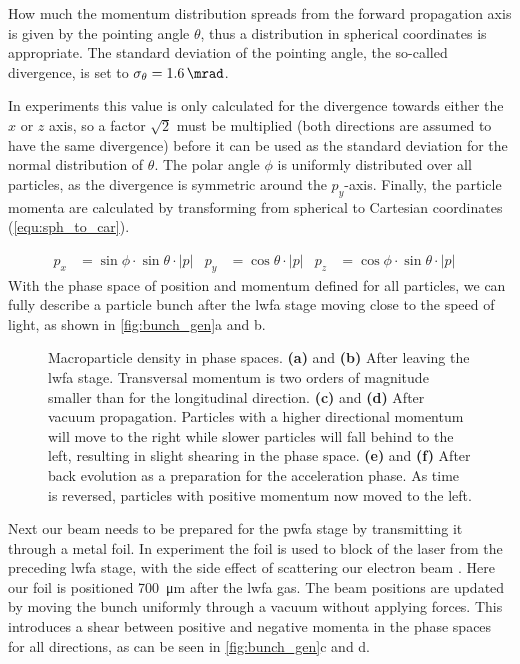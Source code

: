 \documentclass[bachelor_thesis]{subfiles}
\begin{document}
How much the momentum distribution spreads from the forward propagation axis is given by the pointing angle $\theta$, thus a distribution in spherical coordinates is appropriate. The standard deviation of the pointing angle, 
the so-called divergence, is set to $\sigma_{\theta}=\qty{1.6}{\mrad}$.

In experiments this value is only calculated for the divergence towards either the $x$ or $z$ axis, so a factor $\sqrt{2}$ must be multiplied (both directions are assumed to have the same divergence) before 
it can be used as the standard deviation for the normal distribution of $\theta$. The polar angle $\phi$ is uniformly distributed over all particles, as the divergence is symmetric around the $p_y$-axis.
Finally, the particle momenta are calculated by transforming from spherical to Cartesian coordinates (\autoref{equ:sph_to_car}). 

\begin{align}
	p_x&=\sin{\phi} \cdot \sin{\theta} \cdot \left|p\right|	&
	p_y&=\cos{\theta} \cdot \left|p\right|				&
	p_z&=\cos{\phi} \cdot \sin{\theta} \cdot \left|p\right|	&
	\label{equ:sph_to_car}
\end{align}
With the phase space of position and momentum defined for all particles, we can fully describe a particle bunch after the \gls{lwfa} stage moving close to the speed of light, as shown in \autoref{fig:bunch_gen}a and b.

\begin{figure}
	\centering
	
	\caption{Macroparticle density in phase spaces. 
	\textbf{(a)} and \textbf{(b)} After leaving the \gls{lwfa} stage. Transversal momentum is two orders of magnitude smaller than for the longitudinal direction.
	\textbf{(c)} and \textbf{(d)} After vacuum propagation. Particles with a higher directional momentum will move to the right while slower particles will fall behind to the left, resulting in slight shearing in the phase space.
	\textbf{(e)} and \textbf{(f)} After back evolution as a preparation for the acceleration phase. As time is reversed, particles with positive momentum now moved to the left.}
	\label{fig:bunch_gen}
\end{figure}

Next our beam needs to be prepared for the \gls{pwfa} stage by transmitting it through a metal foil. In experiment the foil is used to block of the laser from the preceding \gls{lwfa} stage, 
with the side effect of scattering our electron beam \cite{Raj2020}. Here our foil is positioned \qty{700}{\um} after the \gls{lwfa} gas.
The beam positions are updated by moving the bunch uniformly through a vacuum without applying forces. This introduces a shear between positive and negative momenta in the phase spaces for all directions, as can be seen in \autoref{fig:bunch_gen}c and d.
\end{document}
